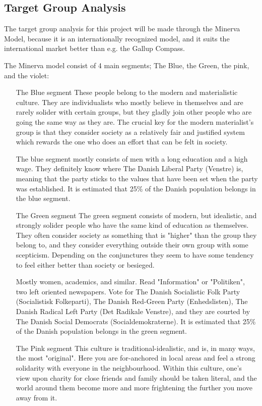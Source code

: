 \subsection{Target Group Analysis}
The target group analysis for this project will be made through the Minerva Model, because it is an internationally recognized model, and it suits the international market better than e.g. the Gallup Compass.

The Minerva model consist of 4 main segments; The Blue, the Green, the pink, and the violet:
\begin{itemize}
\item[The Blue segment]
These people belong to the modern and materialistic culture. They are individualists who mostly believe in themselves and are rarely solider with certain groups, but they gladly join other people who are going the same way as they are. The crucial key for the modern materialist's group is that they consider society as a relatively fair and justified system which rewards the one who does an effort that can be felt in society.

The blue segment mostly consists of men with a long education and a high wage. They definitely know where The Danish Liberal Party (Venstre) is, meaning that the party sticks to the values that have been set when the party was established. It is estimated that 25\% of the Danish population belongs in the blue segment.

\item[The Green segment]
The green segment consists of modern, but idealistic, and strongly solider people who have the same kind of education as themselves. They often consider society as something that is "higher" than the group they belong to, and they consider everything outside their own group with some scepticism. Depending on the conjunctures they seem to have some tendency to feel either better than society or besieged.

Mostly women, academics, and similar. Read "Information" or "Politiken", two left oriented newspapers. Vote for The Danish Socialistic Folk Party (Socialistisk Folkeparti), The Danish Red-Green Party (Enhedslisten), The Danish Radical Left Party (Det Radikale Venstre), and they are courted by The Danish Social Democrats (Socialdemokraterne).
It is estimated that 25\% of the Danish population belongs in the green segment.

\item[The Pink segment]
This culture is traditional-idealistic, and is, in many ways, the most "original". Here you are for-anchored in local areas and feel a strong solidarity with everyone in the neighbourhood. Within this culture, one's view upon charity for close friends and family should be taken literal, and the world around them become more and more frightening the further you move away from it.


\end{itemize}
